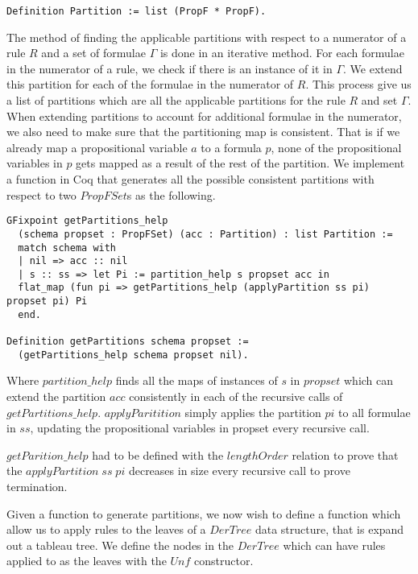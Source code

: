 \documentclass{article}
\begin{document}
\begin{lstlisting}
Definition Partition := list (PropF * PropF).
\end{lstlisting}

The method of finding the applicable partitions with respect to a numerator of
a rule $R$ and a set of formulae $\Gamma$ is done in an iterative method. For
each formulae in the numerator of a rule, we check if there is an instance of
it in $\Gamma$. We extend this partition for each of the formulae in the
numerator of $R$. This process give us a list of partitions which are all the
applicable partitions for the rule $R$ and set $\Gamma$. When extending
partitions to account for additional formulae in the numerator, we also need to
make sure that the partitioning map is consistent. That is if we already map a
propositional variable $a$ to a formula $p$, none of the propositional
variables in $p$ gets mapped as a result of the rest of the partition.  We
implement a function in Coq that generates all the possible consistent
partitions with respect to two $PropFSet$s as the following.

\begin{lstlisting}
GFixpoint getPartitions_help
  (schema propset : PropFSet) (acc : Partition) : list Partition :=
  match schema with
  | nil => acc :: nil
  | s :: ss => let Pi := partition_help s propset acc in
  flat_map (fun pi => getPartitions_help (applyPartition ss pi) propset pi) Pi
  end.

Definition getPartitions schema propset :=
  (getPartitions_help schema propset nil).
\end{lstlisting}

Where $partition\_help$ finds all the maps of instances of $s$ in $propset$ 
which can extend the partition $acc$ consistently in each of the recursive 
calls of $getPartitions\_help$. $applyParitition$ simply applies the partition
$pi$ to all formulae in $ss$, updating the propositional variables in propset
every recursive call.

$getParition\_help$ had to be defined with the $lengthOrder$ relation to prove
that the $applyPartition \; ss \; pi$ decreases in size every recursive call to
prove termination.

Given a function to generate partitions, we now wish to define a function which
allow us to apply rules to the leaves of a $DerTree$ data structure, that is
expand out a tableau tree. We define the nodes in the $DerTree$ which can have
rules applied to as the leaves with the $Unf$ constructor.
\end{document}
